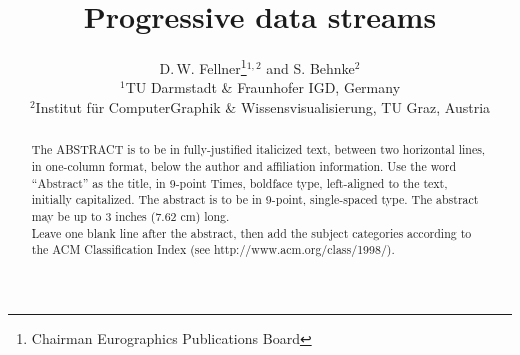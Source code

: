 \documentclass{egpubl}
\title[EG \LaTeX\ Author Guidelines]%
{Progressive data streams}
\author[D. Fellner \& S. Behnke]
{D.\,W. Fellner\thanks{Chairman Eurographics Publications Board}$^{1,2}$
  and S. Behnke$^{2}$
  \\
  $^1$TU Darmstadt \& Fraunhofer IGD, Germany\\
  $^2$Institut f{\"u}r ComputerGraphik \& Wissensvisualisierung, TU Graz, Austria
}
\begin{document}
  

\maketitle

\begin{abstract}
  The ABSTRACT is to be in fully-justified italicized text, 
  between two horizontal lines,
  in one-column format, 
  below the author and affiliation information. 
  Use the word ``Abstract'' as the title, in 9-point Times, boldface type, 
  left-aligned to the text, initially capitalized. 
  The abstract is to be in 9-point, single-spaced type.
  The abstract may be up to 3 inches (7.62 cm) long. \\
  Leave one blank line after the abstract, 
  then add the subject categories according to the ACM Classification Index 
  (see http://www.acm.org/class/1998/).
  
  \begin{classification} %
  \end{classification}
  
\end{abstract}

%






\end{document}

